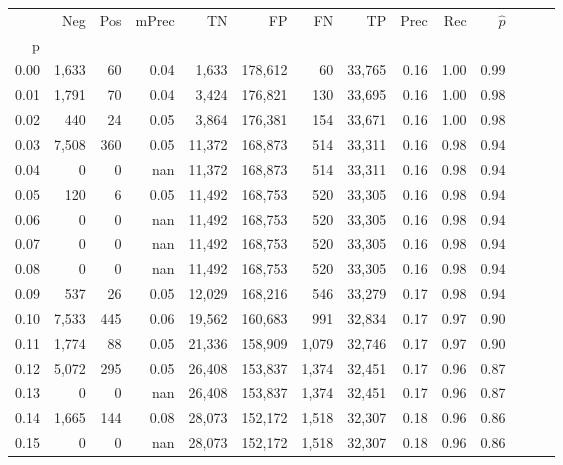 \begin{tabular}{rrrrrrrrrrrrrr}
\toprule
{} &     Neg &    Pos & mPrec &       TN &       FP &      FN &      TP &  Prec &   Rec & $\hat{p}$ \\
p    &         &        &       &          &          &         &         &       &       &           \\
\midrule
0.00 &   1,633 &     60 &  0.04 &    1,633 &  178,612 &      60 &  33,765 &  0.16 &  1.00 &      0.99 \\
0.01 &   1,791 &     70 &  0.04 &    3,424 &  176,821 &     130 &  33,695 &  0.16 &  1.00 &      0.98 \\
0.02 &     440 &     24 &  0.05 &    3,864 &  176,381 &     154 &  33,671 &  0.16 &  1.00 &      0.98 \\
0.03 &   7,508 &    360 &  0.05 &   11,372 &  168,873 &     514 &  33,311 &  0.16 &  0.98 &      0.94 \\
0.04 &       0 &      0 &   nan &   11,372 &  168,873 &     514 &  33,311 &  0.16 &  0.98 &      0.94 \\
0.05 &     120 &      6 &  0.05 &   11,492 &  168,753 &     520 &  33,305 &  0.16 &  0.98 &      0.94 \\
0.06 &       0 &      0 &   nan &   11,492 &  168,753 &     520 &  33,305 &  0.16 &  0.98 &      0.94 \\
0.07 &       0 &      0 &   nan &   11,492 &  168,753 &     520 &  33,305 &  0.16 &  0.98 &      0.94 \\
0.08 &       0 &      0 &   nan &   11,492 &  168,753 &     520 &  33,305 &  0.16 &  0.98 &      0.94 \\
0.09 &     537 &     26 &  0.05 &   12,029 &  168,216 &     546 &  33,279 &  0.17 &  0.98 &      0.94 \\
0.10 &   7,533 &    445 &  0.06 &   19,562 &  160,683 &     991 &  32,834 &  0.17 &  0.97 &      0.90 \\
0.11 &   1,774 &     88 &  0.05 &   21,336 &  158,909 &   1,079 &  32,746 &  0.17 &  0.97 &      0.90 \\
0.12 &   5,072 &    295 &  0.05 &   26,408 &  153,837 &   1,374 &  32,451 &  0.17 &  0.96 &      0.87 \\
0.13 &       0 &      0 &   nan &   26,408 &  153,837 &   1,374 &  32,451 &  0.17 &  0.96 &      0.87 \\
0.14 &   1,665 &    144 &  0.08 &   28,073 &  152,172 &   1,518 &  32,307 &  0.18 &  0.96 &      0.86 \\
0.15 &       0 &      0 &   nan &   28,073 &  152,172 &   1,518 &  32,307 &  0.18 &  0.96 &      0.86 \\

\end{tabular}
